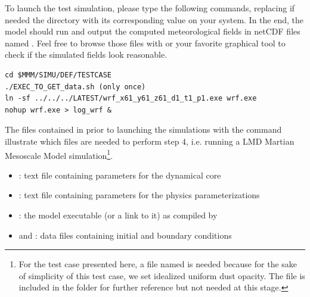 \sk
To launch the test simulation, please type the following commands, replacing if needed the  directory with its corresponding value on your system. In the end, the model should run and output the computed meteorological fields in netCDF files named . Feel free to browse those files with  or your favorite graphical tool to check if the simulated fields look reasonable. 
%
\begin{verbatim}
cd $MMM/SIMU/DEF/TESTCASE
./EXEC_TO_GET_data.sh (only once)
ln -sf ../../../LATEST/wrf_x61_y61_z61_d1_t1_p1.exe wrf.exe  
nohup wrf.exe > log_wrf &
\end{verbatim}

\sk
The files contained in  prior to launching the simulations with the  command illustrate which files are needed to perform step 4, i.e. running a LMD Martian Mesoscale Model simulation\footnote{For the test case presented here, a file named  is needed because for the sake of simplicity of this test case, we set idealized uniform dust opacity. The file  is included in the  folder for further reference but not needed at this stage.}. 
\begin{itemize}
\item {}: text file containing parameters for the dynamical core
\item {}: text file containing parameters for the physics parameterizations
\item {}: the model executable (or a link to it) as compiled by 
\item {} and : data files containing initial and boundary conditions
\end{itemize}

